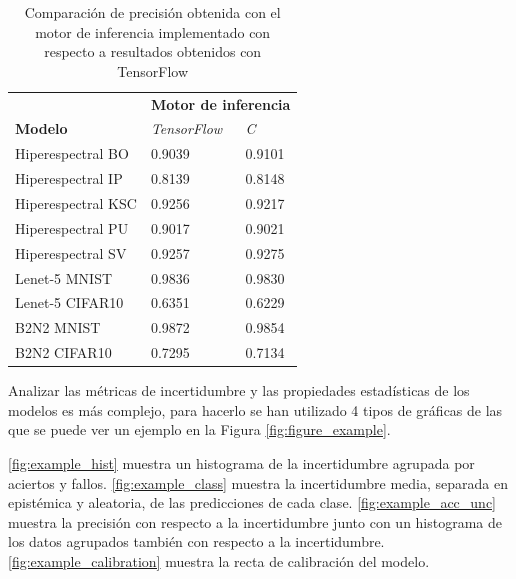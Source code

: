 \begin{table}[ht]
\centering
\caption{Comparación de precisión obtenida con el motor de inferencia implementado con respecto a resultados obtenidos con TensorFlow}
\label{tab:engine_acc}
\begin{tabular}{lll}
\hline
 &  \multicolumn{2}{c}{\textbf{Motor de inferencia}}\\
 \textbf{Modelo} & \textit{TensorFlow} & \textit{C} \\ \hline
 Hiperespectral BO   & 0.9039 & 0.9101 \\
 Hiperespectral IP   & 0.8139 & 0.8148 \\
 Hiperespectral KSC  & 0.9256 & 0.9217 \\
 Hiperespectral PU   & 0.9017 & 0.9021 \\
 Hiperespectral SV   & 0.9257 & 0.9275 \\
 Lenet-5 MNIST      & 0.9836 & 0.9830 \\
 Lenet-5 CIFAR10    & 0.6351 & 0.6229 \\
 B2N2 MNIST         & 0.9872 & 0.9854 \\
 B2N2 CIFAR10       & 0.7295 & 0.7134 \\\hline
\end{tabular}
\end{table}

Analizar las métricas de incertidumbre y las propiedades estadísticas de los modelos es más complejo, para hacerlo se han utilizado 4 tipos de gráficas de las que se puede ver un ejemplo en la Figura \ref{fig:figure_example}. 

\ref{fig:example_hist} muestra un histograma de la incertidumbre agrupada por aciertos y fallos. \ref{fig:example_class} muestra la incertidumbre media, separada en epistémica y aleatoria, de las predicciones de cada clase. \ref{fig:example_acc_unc} muestra la precisión con respecto a la incertidumbre junto con un histograma de los datos agrupados también con respecto a la incertidumbre. \ref{fig:example_calibration} muestra la recta de calibración del modelo.

